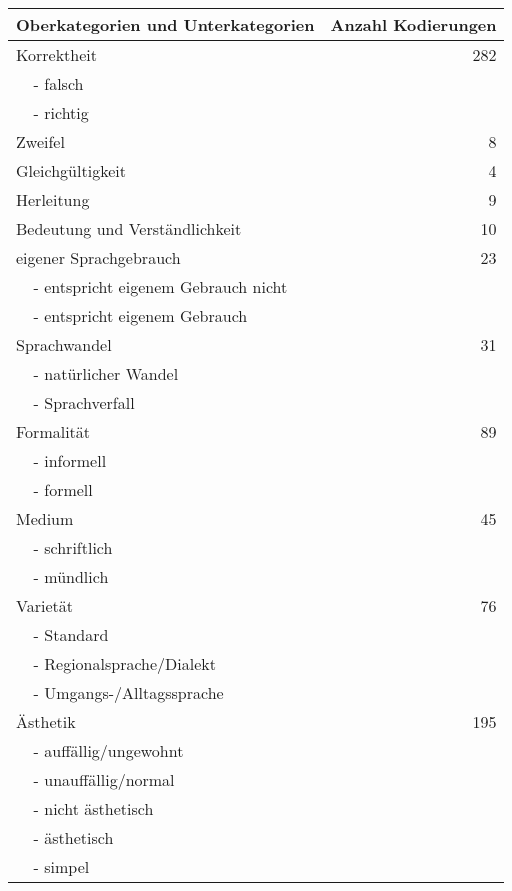 \begin{table}
\small
\begin{tabular}{ll|r}
\multicolumn{2}{l|}{Oberkategorien und Unterkategorien} & Anzahl Kodierungen \\ \hline
\multicolumn{2}{l|}{Korrektheit} & 282 \\ %
\textbf{} & - falsch &  \\ 
\textbf{} & - richtig &  \\ \hline
\multicolumn{2}{l|}{Zweifel} & 8 \\ \hline
\multicolumn{2}{l|}{Gleichgültigkeit} & 4 \\ \hline\multicolumn{2}{l|}{Herleitung} & 9 \\ \hline
\multicolumn{2}{l|}{Bedeutung und Verständlichkeit} & 10 \\ \hline
\multicolumn{2}{l|}{eigener Sprachgebrauch} & 23 \\ %
\textbf{} & - entspricht eigenem Gebrauch nicht &  \\ 
\textbf{} & - entspricht eigenem Gebrauch &  \\ \hline
\multicolumn{2}{l|}{Sprachwandel} & 31 \\ %
\textbf{} & - natürlicher Wandel &  \\ 
\textbf{} & - Sprachverfall &  \\ \hline
\multicolumn{2}{l|}{Formalität} & 89 \\ %
\textbf{} & - informell &  \\ 
\textbf{} & - formell &  \\ \hline
\multicolumn{2}{l|}{Medium} & 45 \\ %
\textbf{} & - schriftlich &  \\ 
\textbf{} & - mündlich &  \\ \hline
\multicolumn{2}{l|}{Varietät} & 76 \\ %
\textbf{} & - Standard &  \\ 
\textbf{} & - Regionalsprache/Dialekt &  \\ 
\textbf{} & - Umgangs-/Alltagssprache &  \\ \hline
\multicolumn{2}{l|}{Ästhetik} & 195 \\ %
\textbf{} & - auffällig/ungewohnt &  \\ 
\textbf{} & - unauffällig/normal &  \\ 
\textbf{} & - nicht ästhetisch &  \\ 
\textbf{} & - ästhetisch &  \\ 
\textbf{} & - simpel &  \\ \hline

\end{tabular}
\end{table}
